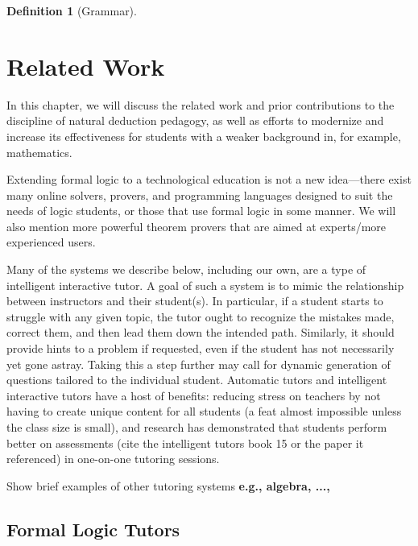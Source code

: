 \documentclass[ms]{uncgdissertationexp2}
\theoremstyle{plain}
\theoremstyle{definition}
\newtheorem{definition}[theorem]{Definition}
\theoremstyle{remark}
\begin{document}
\begin{definition}[Grammar]
\end{definition}

\chapter{Related Work}\label{chapter:2}
In this chapter, we will discuss the related work and prior contributions to the discipline of natural deduction pedagogy, as well as efforts to modernize and increase its effectiveness for students with a weaker background in, for example, mathematics. 

Extending formal logic to a technological education is not a new idea---there exist many online solvers, provers, and programming languages designed to suit the needs of logic students, or those that use formal logic in some manner. We will also mention more powerful theorem provers that are aimed at experts/more experienced users.

Many of the systems we describe below, including our own, are a type of intelligent interactive tutor. A goal of such a system is to mimic the relationship between instructors and their student(s). In particular, if a student starts to struggle with any given topic, the tutor ought to recognize the mistakes made, correct them, and then lead them down the intended path. Similarly, it should provide hints to a problem if requested, even if the student has not necessarily yet gone astray. Taking this a step further may call for dynamic generation of questions tailored to the individual student. Automatic tutors and intelligent interactive tutors have a host of benefits: reducing stress on teachers by not having to create unique content for all students (a feat almost impossible unless the class size is small), and research has demonstrated that students perform better on assessments (cite the intelligent tutors book 15 or the paper it referenced) in one-on-one tutoring sessions.

Show brief examples of other tutoring systems \textbf{e.g., algebra, ..., \cite{autexier}}
\section{Formal Logic Tutors}
\end{document}
